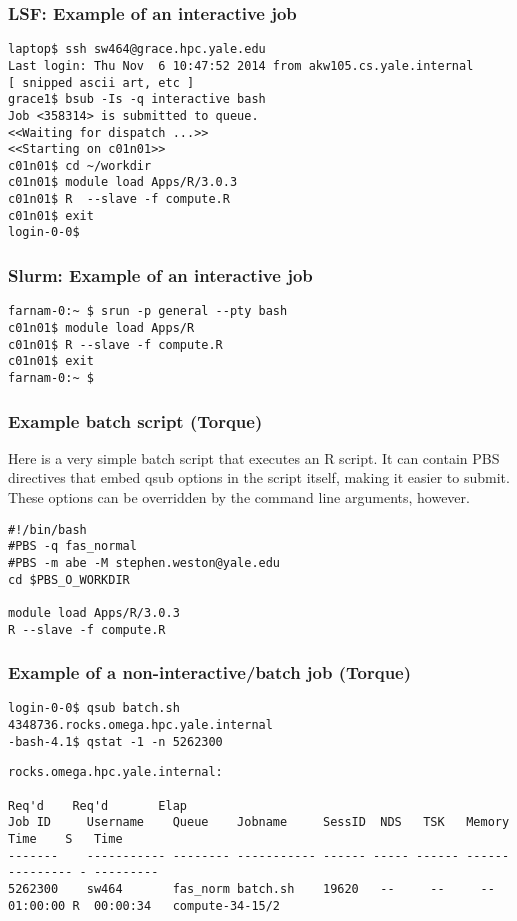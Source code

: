 \documentclass[10pt]{beamer}
\newcommand\tinyfont{\fontsize{4pt}{7.2}\selectfont}
\newcommand\smallfont{\fontsize{8pt}{7.2}\selectfont}
\begin{document}
\begin{frame}[fragile]
\frametitle{LSF: Example of an interactive job}
\begin{verbatim}
laptop$ ssh sw464@grace.hpc.yale.edu
Last login: Thu Nov  6 10:47:52 2014 from akw105.cs.yale.internal
[ snipped ascii art, etc ]
grace1$ bsub -Is -q interactive bash
Job <358314> is submitted to queue.
<<Waiting for dispatch ...>>
<<Starting on c01n01>>
c01n01$ cd ~/workdir
c01n01$ module load Apps/R/3.0.3
c01n01$ R  --slave -f compute.R
c01n01$ exit 
login-0-0$ 
\end{verbatim}
\end{frame}

\begin{frame}[fragile]
\frametitle{Slurm: Example of an interactive job}
\begin{verbatim}
farnam-0:~ $ srun -p general --pty bash
c01n01$ module load Apps/R
c01n01$ R --slave -f compute.R
c01n01$ exit
farnam-0:~ $
\end{verbatim}
\end{frame}

\begin{frame}[fragile]
\frametitle{Example batch script (Torque)}
Here is a very simple batch script that executes an R script.
It can contain PBS directives that embed qsub options
in the script itself, making it easier to submit.  These options
can be overridden by the command line arguments, however.

\begin{block}{}
\begin{verbatim}
#!/bin/bash
#PBS -q fas_normal
#PBS -m abe -M stephen.weston@yale.edu
cd $PBS_O_WORKDIR

module load Apps/R/3.0.3
R --slave -f compute.R
\end{verbatim}
\end{block}
\end{frame}

\begin{frame}[fragile]
\frametitle{Example of a non-interactive/batch job (Torque)}
\smallfont
\begin{verbatim}
login-0-0$ qsub batch.sh
4348736.rocks.omega.hpc.yale.internal
-bash-4.1$ qstat -1 -n 5262300
\end{verbatim}
\tinyfont
\begin{verbatim}
rocks.omega.hpc.yale.internal: 
                                                                                  Req'd    Req'd       Elap
Job ID     Username    Queue    Jobname     SessID  NDS   TSK   Memory   Time    S   Time
-------    ----------- -------- ----------- ------ ----- ------ ------ --------- - ---------
5262300    sw464       fas_norm batch.sh    19620   --     --     --   01:00:00 R  00:00:34   compute-34-15/2

\end{verbatim}
\end{frame}
\end{document}
